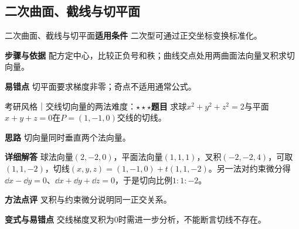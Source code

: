 \subsection{二次曲面、截线与切平面}\label{deep:geometry_source_deep:quadrics}

\begin{method}{二次曲面、截线与切平面}\textbf{适用条件} 二次型可通过正交坐标变换标准化。\par\textbf{步骤与依据} 配方定中心，比较正负号和秩；曲线交点处用两曲面法向量叉积求切向量。\par\textbf{易错点} 切平面要求梯度非零；奇点不适用通常公式。\end{method}

\begin{example}{考研风格｜交线切向量的两法}{难度：$\star\star\star$}\label{deep:ex:geometry_source_deep:intersection}\textbf{题目} 求球$x^2+y^2+z^2=2$与平面$x+y+z=0$在$P=(1,-1,0)$交线的切线。\par\textbf{思路} 切向量同时垂直两个法向量。\par\textbf{详细解答} 球法向量$(2,-2,0)$，平面法向量$(1,1,1)$，叉积$(-2,-2,4)$，可取$(1,1,-2)$，切线$(x,y,z)=(1,-1,0)+t(1,1,-2)$。另一法对约束微分得$\dd x-\dd y=0$、$\dd x+\dd y+\dd z=0$，于是切向比例$1:1:-2$。\par\textbf{方法点评} 叉积与约束微分说明同一正交关系。\par\textbf{变式与易错点} 交线梯度叉积为0时需进一步分析，不能断言切线不存在。\end{example}
